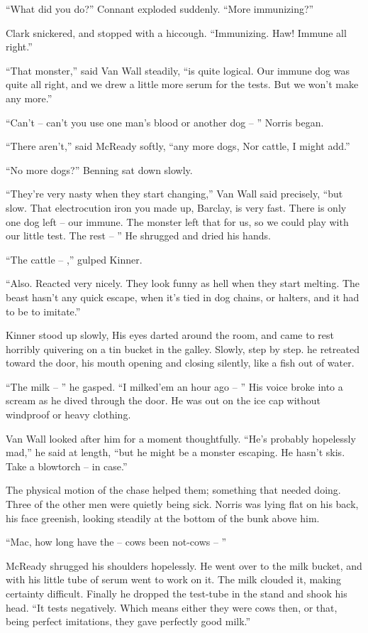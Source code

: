 \documentclass[letterpaper,openany,12pt]{memoir}		%
\begin{document}
``What did you do?'' Connant exploded suddenly. ``More immunizing?''

Clark snickered, and stopped with a hiccough. ``Immunizing. Haw! Immune all
right.''

``That monster,'' said Van Wall steadily, ``is quite logical. Our immune dog was
quite all right, and we drew a little more serum for the tests. But we won't
make any more.''

``Can't -- can't you use one man's blood or another dog -- '' Norris began.

``There aren't,'' said McReady softly, ``any more dogs, Nor cattle, I might
add.''

``No more dogs?'' Benning sat down slowly.

``They're very nasty when they start changing,'' Van Wall said precisely, ``but
slow. That electrocution iron you made up, Barclay, is very fast. There is only
one dog left -- our immune. The monster left that for us, so we could play with
our little test. The rest -- '' He shrugged and dried his hands.

``The cattle -- ,'' gulped Kinner.

``Also. Reacted very nicely. They look funny as hell when they start melting.
The beast hasn't any quick escape, when it's tied in dog chains, or halters, and
it had to be to imitate.''

Kinner stood up slowly, His eyes darted around the room, and came to rest
horribly quivering on a tin bucket in the galley. Slowly, step by step. he
retreated toward the door, his mouth opening and closing silently, like a fish
out of water.

``The milk -- '' he gasped. ``I milked'em an hour ago -- '' His voice broke into
a scream as he dived through the door. He was out on the ice cap without
windproof or heavy clothing.

Van Wall looked after him for a moment thoughtfully. ``He's probably hopelessly
mad,'' he said at length, ``but he might be a monster escaping. He hasn't skis.
Take a blowtorch -- in case.''

The physical motion of the chase helped them; something that needed doing. Three
of the other men were quietly being sick. Norris was lying flat on his back, his
face greenish, looking steadily at the bottom of the bunk above him.

``Mac, how long have the -- cows been not-cows -- ''

McReady shrugged his shoulders hopelessly. He went over to the milk bucket, and
with his little tube of serum went to work on it. The milk clouded it, making
certainty difficult. Finally he dropped the test-tube in the stand and shook his
head. ``It tests negatively. Which means either they were cows then, or that,
being perfect imitations, they gave perfectly good milk.''
\end{document}
